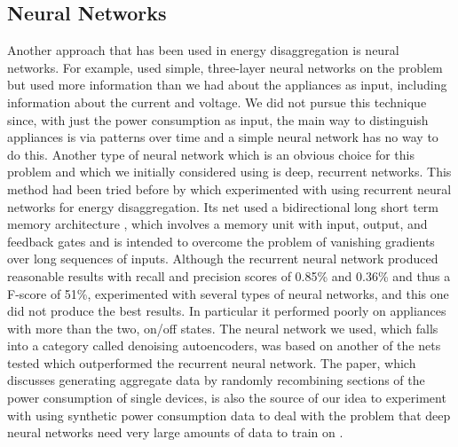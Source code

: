 \documentclass{article}
\begin{document}



\subsection{Neural Networks}
Another approach that has been used in energy disaggregation is neural networks. For example, \cite{Ruzzelli} used simple, three-layer neural networks on the problem but used more information than we had about the appliances as input, including information about the current and voltage. We did not pursue this technique since, with just the power consumption as input, the main way to distinguish appliances is via patterns over time and a simple neural network has no way to do this. Another type of neural network which is an obvious choice for this problem and which we initially considered using is deep, recurrent networks. This method had been tried  before by \cite{Kelly} which experimented with using recurrent neural networks for energy disaggregation. Its net used a bidirectional long short term memory architecture \cite{Kelly}, which involves a memory unit with input, output, and feedback gates and is intended to overcome the problem of vanishing gradients over long sequences of inputs. Although the recurrent neural network produced reasonable results with recall and precision scores of 0.85\% and 0.36\% and thus a F-score of 51\%, \cite{Kelly} experimented with several types of neural networks, and this one did not produce the best results. In particular it performed poorly on appliances with more than the two, on/off states. The neural network we used, which falls into a category called denoising autoencoders, was based on another of the nets \cite{Kelly} tested which outperformed the recurrent neural network. The paper, which discusses generating aggregate data by randomly recombining sections of the power consumption of single devices, is also the source of our idea to experiment with using synthetic power consumption data to deal with the problem that deep neural networks need very large amounts of data to train on \cite{Kelly}.
\end{document}
